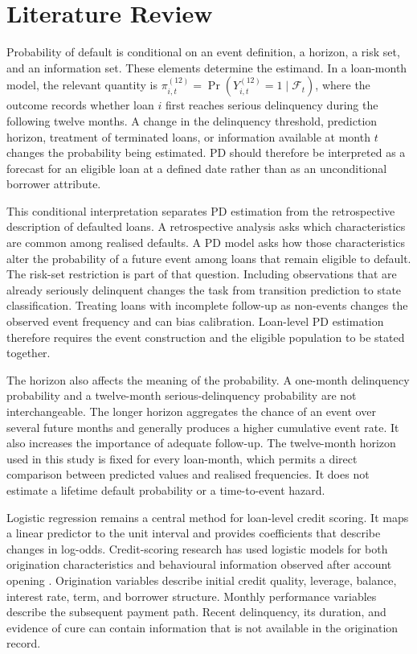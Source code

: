 \chapter{Literature Review}
\label{chap:literature}

Probability of default is conditional on an event definition, a horizon, a risk set, and an information set. These elements determine the estimand. In a loan-month model, the relevant quantity is $\pi_{i,t}^{(12)}=\Pr(Y_{i,t}^{(12)}=1\mid\mathcal{F}_t)$, where the outcome records whether loan $i$ first reaches serious delinquency during the following twelve months. A change in the delinquency threshold, prediction horizon, treatment of terminated loans, or information available at month $t$ changes the probability being estimated. PD should therefore be interpreted as a forecast for an eligible loan at a defined date rather than as an unconditional borrower attribute.

This conditional interpretation separates PD estimation from the retrospective description of defaulted loans. A retrospective analysis asks which characteristics are common among realised defaults. A PD model asks how those characteristics alter the probability of a future event among loans that remain eligible to default. The risk-set restriction is part of that question. Including observations that are already seriously delinquent changes the task from transition prediction to state classification. Treating loans with incomplete follow-up as non-events changes the observed event frequency and can bias calibration. Loan-level PD estimation therefore requires the event construction and the eligible population to be stated together.

The horizon also affects the meaning of the probability. A one-month delinquency probability and a twelve-month serious-delinquency probability are not interchangeable. The longer horizon aggregates the chance of an event over several future months and generally produces a higher cumulative event rate. It also increases the importance of adequate follow-up. The twelve-month horizon used in this study is fixed for every loan-month, which permits a direct comparison between predicted values and realised frequencies. It does not estimate a lifetime default probability or a time-to-event hazard.

Logistic regression remains a central method for loan-level credit scoring. It maps a linear predictor to the unit interval and provides coefficients that describe changes in log-odds. Credit-scoring research has used logistic models for both origination characteristics and behavioural information observed after account opening \citep{hand_henley_1997,thomas2000survey,costa2020logistic}. Origination variables describe initial credit quality, leverage, balance, interest rate, term, and borrower structure. Monthly performance variables describe the subsequent payment path. Recent delinquency, its duration, and evidence of cure can contain information that is not available in the origination record.

